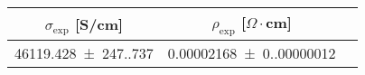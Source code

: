 \begin{tabular}{ccc}
\toprule
$\sigma_{\exp}$ [S/cm] & $\rho_{\exp}$ [$\Omega  \cdot$cm] \\
\midrule
\num{46119.428(247.737)} & \num{0.00002168(0.00000012)} \\
\bottomrule
\end{tabular}
